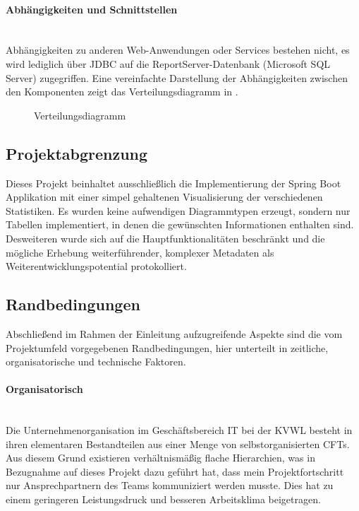 \paragraph{Abhängigkeiten und Schnittstellen} ~\\
\label{p:Abhaengigkeiten}
Abhängigkeiten zu anderen Web-Anwendungen oder Services bestehen nicht, es wird lediglich über \ac{JDBC} auf die ReportServer-Datenbank (Microsoft SQL Server) zugegriffen. Eine vereinfachte Darstellung der Abhängigkeiten zwischen den Komponenten zeigt das Verteilungsdiagramm in .
\begin{figure}[htb]
	\centering
	\caption{Verteilungsdiagramm}
	\label{fig:Deployment}
\end{figure} 

\subsection{Projektabgrenzung} 
\label{sec:Projektabgrenzung}
Dieses Projekt beinhaltet ausschließlich die Implementierung der Spring Boot Applikation mit einer simpel gehaltenen Visualisierung der verschiedenen Statistiken. Es wurden keine aufwendigen Diagrammtypen erzeugt, sondern nur Tabellen implementiert, in denen die gewünschten Informationen enthalten sind.
Desweiteren wurde sich auf die Hauptfunktionalitäten beschränkt und die mögliche Erhebung weiterführender, komplexer Metadaten als Weiterentwicklungspotential protokolliert.

\subsection{Randbedingungen} 
\label{sec:Randbedingungen}
Abschließend im Rahmen der Einleitung aufzugreifende Aspekte sind die vom Projektumfeld vorgegebenen Randbedingungen, hier unterteilt in zeitliche, organisatorische und technische Faktoren.

\paragraph{Organisatorisch} ~\\
\label{p:Randbedingungen:Organisatorisch}
Die Unternehmenorganisation im Geschäftsbereich IT bei der \ac{KVWL} besteht in ihren elementaren Bestandteilen aus einer Menge von selbstorganisierten \ac{CFT}s. Aus diesem Grund existieren verhältnismäßig flache Hierarchien, was in Bezugnahme auf dieses Projekt dazu geführt hat, dass mein Projektfortschritt nur Ansprechpartnern des Teams kommuniziert werden musste. Dies hat zu einem geringeren Leistungsdruck und besseren Arbeitsklima beigetragen.

